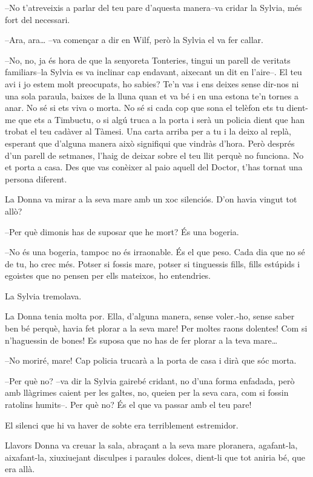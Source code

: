 --No t'atreveixis a parlar del teu pare d'aquesta manera--va cridar la
Sylvia, més fort del necessari.

--Ara, ara\ldots{} --va començar a dir en Wilf, però la Sylvia el va fer
callar.

--No, no, ja és hora de que la senyoreta Tonteries, tingui un parell de
veritats familiars--la Sylvia es va inclinar cap endavant, aixecant un
dit en l'aire--. El teu avi i jo estem molt preocupats, ho sabies? Te'n
vas i ens deixes sense dir-nos ni una sola paraula, baixes de la lluna
quan et va bé i en una estona te'n tornes a anar. No sé si ets viva o
morta. No sé si cada cop que sona el telèfon ets tu dient-me que ets a
Timbuctu, o si algú truca a la porta i serà un policia dient que han
trobat el teu cadàver al Tàmesi. Una carta arriba per a tu i la deixo al
replà, esperant que d'alguna manera això signifiqui que vindràs d'hora.
Però després d'un parell de setmanes, l'haig de deixar sobre el teu llit
perquè no funciona. No et porta a casa. Des que vas conèixer al paio
aquell del Doctor, t'has tornat una persona diferent.

La Donna va mirar a la seva mare amb un xoc silenciós. D'on havia vingut
tot allò?

--Per què dimonis has de suposar que he mort? És una bogeria.

--No és una bogeria, tampoc no és irraonable. És el que peso. Cada dia
que no sé de tu, ho crec més. Potser si fossis mare, potser si
tinguessis fills, fills estúpids i egoistes que no pensen per ells
mateixos, ho entendries.

La Sylvia tremolava.

La Donna tenia molta por. Ella, d'alguna manera, sense voler.-ho, sense
saber ben bé perquè, havia fet plorar a la seva mare! Per moltes raons
dolentes! Com si n'haguessin de bones! Es suposa que no has de fer
plorar a la teva mare\ldots{}

--No moriré, mare! Cap policia trucarà a la porta de casa i dirà que sóc
morta.

--Per què no? --va dir la Sylvia gairebé cridant, no d'una forma
enfadada, però amb llàgrimes caient per les galtes, no, queien per la
seva cara, com si fossin ratolins humits--. Per què no? És el que va
passar amb el teu pare!

El silenci que hi va haver de sobte era terriblement estremidor.

Llavors Donna va creuar la sala, abraçant a la seva mare ploranera,
agafant-la, aixafant-la, xiuxiuejant disculpes i paraules dolces,
dient-li que tot aniria bé, que era allà.

